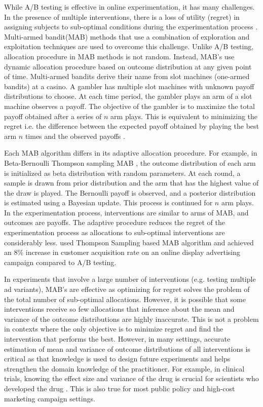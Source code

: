 \documentclass[12pt, letterpaper]{article}
\begin{document}
While A/B testing is effective in online experimentation, it has many challenges. In the presence of multiple interventions, there is a loss of utility (regret) in assigning subjects to sub-optimal conditions during the experimentation process \citep{white2012bandit}. Multi-armed bandit(MAB) methods that use a combination of exploration and exploitation techniques are used to overcome this challenge. Unlike A/B testing, allocation procedure in MAB methods is not random. Instead, MAB's use dynamic allocation procedure based on outcome distribution at any given point of time. Multi-armed bandits derive their name from slot machines (one-armed bandits) at a casino. A gambler has multiple slot machines with unknown payoff distributions to choose. At each time period, the gambler plays an arm of a slot machine observes a payoff. The objective of the gambler is to maximize the total payoff obtained after a series of $n$ arm plays. This is equivalent to minimizing the regret i.e. the difference between the expected payoff obtained by playing the best arm $n$ times and the observed payoffs \citep{lattimore2018bandit}. 

Each MAB algorithm differs in its adaptive allocation procedure. For example, in Beta-Bernoulli Thompson sampling MAB \citep{thompson1933likelihood}, the outcome distribution of each arm is initialized as beta distribution with random parameters. At each round, a sample is drawn from prior distribution and the arm that has the highest value of the draw is played. The Bernoulli payoff is observed, and a posterior distribution is estimated using a Bayesian update. This process is continued for $n$ arm plays. In the experimentation process, interventions are similar to arms of MAB, and outcomes are payoffs. The adaptive procedure reduces the regret of the experimentation process as allocations to sub-optimal interventions are considerably less. \cite{schwartz2017customer} used Thompson Sampling based MAB algorithm and achieved an 8\% increase in customer acquisition rate on an online display advertising campaign compared to A/B testing.

In experiments that involve a large number of interventions (e.g. testing multiple ad variants), MAB's are effective as optimizing for regret solves the problem of the total number of sub-optimal allocations. However, it is possible that some interventions receive so few allocations that inference about the mean and variance of the outcome distributions are highly inaccurate. This is not a problem in contexts where the only objective is to minimize regret and find the intervention that performs the best. However, in many settings, accurate estimation of mean and variance of outcome distributions of all interventions is critical as that knowledge is used to design future experiments and helps strengthen the domain knowledge of the practitioner. For example, in clinical trials, knowing the effect size and variance of the drug is crucial for scientists who developed the drug \citep{nie2017adaptively}. This is also true for most public policy and high-cost marketing campaign settings.
\end{document}
